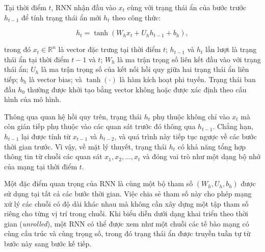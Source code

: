 \documentclass[12pt,oneside]{report}
\begin{document}
Tại thời điểm $t$, RNN nhận đầu vào $x_t$ cùng với trạng thái ẩn của bước trước $h_{t-1}$ để tính trạng thái ẩn mới $h_t$ theo công thức:

\begin{equation}
h_t = \tanh(W_h x_t + U_h h_{t-1} + b_h),
\end{equation}

trong đó $x_t \in \mathbb{R}^{n}$ là vector đặc trưng tại thời điểm $t$; $h_{t-1}$ và $h_t$ lần lượt là trạng thái ẩn tại thời điểm $t-1$ và $t$; $W_h$ là ma trận trọng số liên kết đầu vào với trạng thái ẩn; $U_h$ là ma trận trọng số của kết nối hồi quy giữa hai trạng thái ẩn liên tiếp; $b_h$ là vector bias; và $\tanh(\cdot)$ là hàm kích hoạt phi tuyến. Trạng thái ban đầu $h_0$ thường được khởi tạo bằng vector không hoặc được xác định theo cấu hình của mô hình.

Thông qua quan hệ hồi quy trên, trạng thái $h_t$ phụ thuộc không chỉ vào $x_t$ mà còn gián tiếp phụ thuộc vào các quan sát trước đó thông qua $h_{t-1}$. Chẳng hạn, $h_{t-1}$ lại được tính từ $x_{t-1}$ và $h_{t-2}$, và quá trình này tiếp tục ngược về các bước thời gian trước. Vì vậy, về mặt lý thuyết, trạng thái $h_t$ có khả năng tổng hợp thông tin từ chuỗi các quan sát $x_1,x_2,\dots,x_t$ và đóng vai trò như một dạng bộ nhớ của mạng tại thời điểm $t$.

Một đặc điểm quan trọng của RNN là cùng một bộ tham số $(W_h,U_h,b_h)$ được sử dụng tại tất cả các bước thời gian. Việc chia sẻ tham số này cho phép mạng xử lý các chuỗi có độ dài khác nhau mà không cần xây dựng một tập tham số riêng cho từng vị trí trong chuỗi. Khi biểu diễn dưới dạng khai triển theo thời gian (\textit{unrolled}), một RNN có thể được xem như một chuỗi các tế bào mạng có cùng cấu trúc và cùng trọng số, trong đó trạng thái ẩn được truyền tuần tự từ bước này sang bước kế tiếp.
\end{document}
